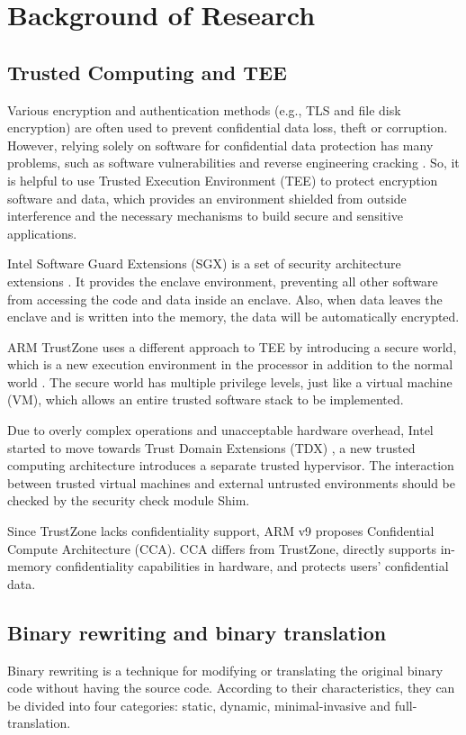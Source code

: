 \section{Background of Research}
\subsection{Trusted Computing and TEE}
Various encryption and authentication methods (e.g., TLS and file disk encryption)
are often used to prevent confidential data loss, theft or corruption.
However, relying solely on software for confidential data protection has many problems,
such as software vulnerabilities and reverse engineering cracking \cite{Zimba2021ARC}.
So, it is helpful to use Trusted Execution Environment (TEE) to protect encryption software
and data, which provides an environment shielded from outside interference and the necessary
mechanisms to build secure and sensitive applications.

Intel Software Guard Extensions (SGX) is a set of security architecture extensions 
\cite{McKeen2013InnovativeIA}.
It provides the enclave environment, preventing all other software from accessing 
the code and data inside an enclave. Also, when data leaves the enclave and is written
into the memory, the data will be automatically encrypted.

ARM TrustZone uses a different approach to TEE by introducing a secure world,
which is a new execution environment in the processor in addition to the normal world
\cite{Mukhtar2019ArchitecturesFS}. The secure world has multiple privilege levels,
just like a virtual machine (VM), which allows an entire trusted software stack to
be implemented.

Due to overly complex operations and unacceptable hardware overhead, Intel started to move
towards Trust Domain Extensions (TDX) \cite{Sahita2021SecurityAO, Sardar2021DemystifyingAI},
a new trusted computing architecture introduces a separate trusted hypervisor. The interaction
between trusted virtual machines and external untrusted environments should be checked by the
security check module Shim.

Since TrustZone lacks confidentiality support, ARM v9 proposes Confidential Compute Architecture (CCA).
CCA \cite{CCA} differs from TrustZone, directly supports in-memory confidentiality capabilities in hardware,
and protects users' confidential data.

\subsection{Binary rewriting and binary translation}
Binary rewriting is a technique for modifying or translating the original binary code
without having the source code. According to their characteristics, they can be divided
into four categories: static, dynamic, minimal-invasive and full-translation.

